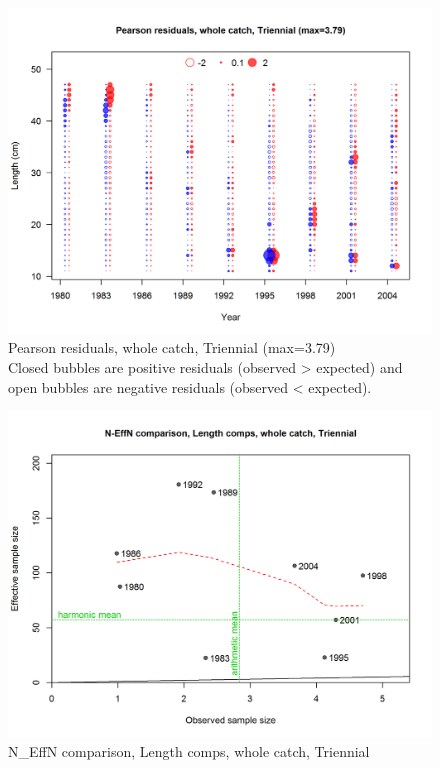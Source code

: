 \documentclass[12pt,]{article}
\begin{document}
\begin{figure}
\centering
\includegraphics{./r4ss/plots_mod1/comp_lenfit_residsflt5mkt0.png}
\caption{Pearson residuals, whole catch, Triennial (max=3.79)\\
Closed bubbles are positive residuals (observed \textgreater{} expected)
and open bubbles are negative residuals (observed \textless{} expected).
\label{fig:mod1_19_comp_lenfit_residsflt5mkt0}}
\end{figure}

\begin{figure}
\centering
\includegraphics{./r4ss/plots_mod1/comp_lenfit_sampsize_flt5mkt0.png}
\caption{N\_EffN comparison, Length comps, whole catch, Triennial
\label{fig:mod1_20_comp_lenfit_sampsize_flt5mkt0}}
\end{figure}
\end{document}
